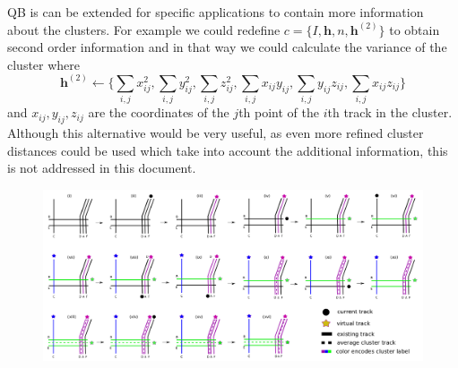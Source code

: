 \documentclass[preprint,authoryear,a4paper,10pt,onecolumn]{elsarticle}
\begin{document}
QB is can be extended for specific applications to contain more information
about the clusters. For example we could redefine $c=\{I,\mathbf{h},n,\mathbf{h}^{(2)}\}$
to obtain second order information and in that way we could calculate
the variance of the cluster where \[
\mathbf{h}^{(2)}\leftarrow\{\sum_{i,j}x_{ij}^{2},\sum_{i,j}y_{ij}^{2},\sum_{i,j}z_{ij}^{2},\sum_{i,j}x_{ij}y_{ij},\sum_{i,j}y_{ij}z_{ij},\sum_{i,j}x_{ij}z_{ij}\}\]
 and $x_{ij},y_{ij},z_{ij}$ are the coordinates of the $j$th point
of the $i$th track in the cluster. Although this alternative would
be very useful, as even more refined cluster distances could be used
which take into account the additional information, this is not addressed
in this document.

%
\begin{figure}
\includegraphics[scale=0.27]{last_figures/LSC_algorithm}


\end{figure}
\end{document}
